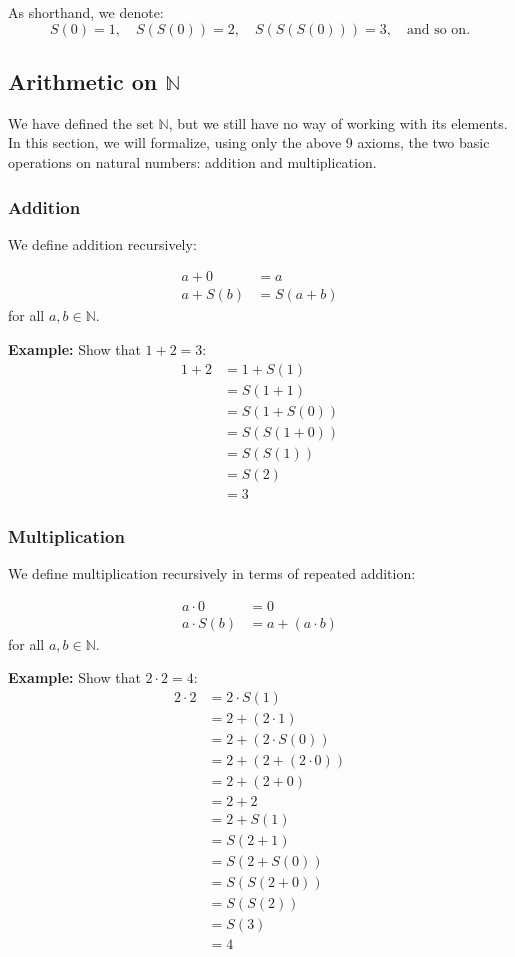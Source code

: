 As shorthand, we denote:
\[
S(0) = 1, \quad S(S(0)) = 2, \quad S(S(S(0))) = 3, \quad \text{and so on.}
\]

\subsection{Arithmetic on \( \mathbb{N} \)}

We have defined the set \( \mathbb{N} \), but we still have no way of working with its elements. In this section, we will formalize, using only the above 9 axioms, the two basic operations on natural numbers: addition and multiplication.

\subsubsection{Addition}

We define addition recursively:


\begin{align*}
a + 0 &= a \\
a + S(b) &= S(a + b)
\end{align*}
for all \( a, b \in \mathbb{N} \).


\textbf{Example:} Show that \( 1 + 2 = 3 \):
\begin{align*}
1 + 2 &= 1 + S(1) \\
&= S(1 + 1) \\
&= S(1 + S(0)) \\
&= S(S(1 + 0)) \\
&= S(S(1)) \\
&= S(2) \\
&= 3
\end{align*}

\subsubsection{Multiplication}

We define multiplication recursively in terms of repeated addition:


\begin{align*}
a \cdot 0 &= 0 \\
a \cdot S(b) &= a + (a \cdot b)
\end{align*}
for all \( a, b \in \mathbb{N} \).


\textbf{Example:} Show that \( 2 \cdot 2 = 4 \):
\begin{align*}
2 \cdot 2 &= 2 \cdot S(1) \\
&= 2 + (2 \cdot 1) \\
&= 2 + (2 \cdot S(0)) \\
&= 2 + (2 + (2 \cdot 0)) \\
&= 2 + (2 + 0) \\
&= 2 + 2 \\
&= 2 + S(1) \\
&= S(2 + 1) \\
&= S(2 + S(0)) \\
&= S(S(2 + 0)) \\
&= S(S(2)) \\
&= S(3) \\
&= 4
\end{align*}

